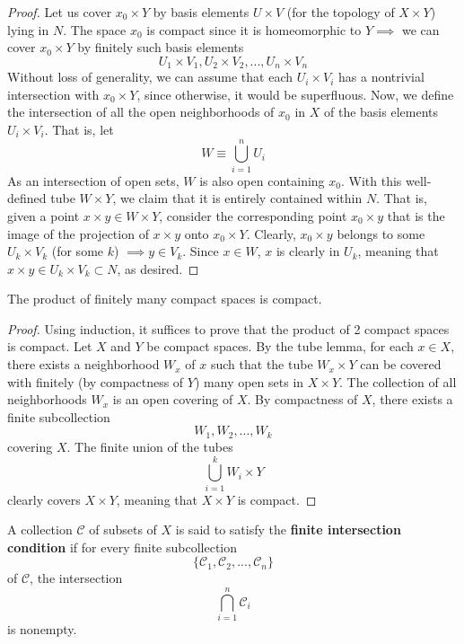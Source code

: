     \begin{proof}
    Let us cover $x_0 \times Y$ by basis elements $U \times V$ (for the topology of $X \times Y$) lying in $N$. The space $x_0$ is compact since it is homeomorphic to $Y \implies$ we can cover $x_0 \times Y$ by finitely such basis elements
    \[U_1 \times V_1, U_2 \times V_2, ..., U_n \times V_n\]
    Without loss of generality, we can assume that each $U_i \times V_i$ has a nontrivial intersection with $x_0 \times Y$, since otherwise, it would be superfluous. Now, we define the intersection of all the open neighborhoods of $x_0$ in $X$ of the basis elements $U_i \times V_i$. That is, let
    \[W \equiv \bigcup_{i=1}^n U_i\]
    As an intersection of open sets, $W$ is also open containing $x_0$. With this well-defined tube $W \times Y$, we claim that it is entirely contained within $N$. That is, given a point $x \times y \in W \times Y$, consider the corresponding point $x_0 \times y$ that is the image of the projection of $x\times y$ onto $x_0 \times Y$. Clearly, $x_0 \times y$ belongs to some $U_k \times V_k$ (for some $k$) $\implies y \in V_k$. Since $x \in W$, $x$ is clearly in $U_k$, meaning that $x \times y \in U_k \times V_k \subset N$, as desired. 
    \end{proof}

    \begin{theorem}
    The product of finitely many compact spaces is compact. 
    \end{theorem}
    \begin{proof}
    Using induction, it suffices to prove that the product of 2 compact spaces is compact. Let $X$ and $Y$ be compact spaces. By the tube lemma, for each $x \in X$, there exists a neighborhood $W_x$ of $x$ such that the tube $W_x \times Y$ can be covered with finitely (by compactness of $Y$) many open sets in $X \times Y$. The collection of all neighborhoods $W_x$ is an open covering of $X$. By compactness of $X$, there exists a finite subcollection
    \[W_1, W_2, ..., W_k\]
    covering $X$. The finite union of the tubes 
    \[\bigcup_{i=1}^k W_i \times Y\]
    clearly covers $X \times Y$, meaning that $X \times Y$ is compact. 
    \end{proof}

    \begin{definition}
    A collection $\mathcal{C}$ of subsets of $X$ is said to satisfy the \textbf{finite intersection condition} if for every finite subcollection 
    \[\{\mathcal{C}_1, \mathcal{C}_2, ..., \mathcal{C}_n\}\]
    of $\mathcal{C}$, the intersection
    \[\bigcap_{i=1}^n \mathcal{C}_i\]
    is nonempty. 
    \end{definition}

